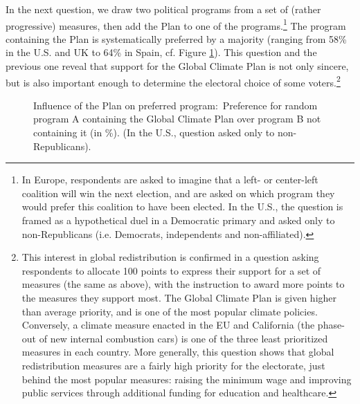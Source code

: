 \documentclass[a5paper,english,openany]{memoir}
\begin{document}
In the next question, we draw two political programs from a set of (rather progressive) measures, then add the Plan to one of the programs.\footnote{In Europe, respondents are asked to imagine that a left- or center-left coalition will win the next election, and are asked on which program they would prefer this coalition to have been elected. In the U.S., the question is framed as a hypothetical duel in a Democratic primary and asked only to non-Republicans (i.e. Democrats, independents and non-affiliated).} The program containing the Plan is systematically preferred by a majority (ranging from 58\% in the U.S. and UK to 64\% in Spain, cf. Figure \ref{fig:conjoint_left_ag_b}). This question and the previous one reveal that support for the Global Climate Plan is not only sincere, but is also important enough to determine the electoral choice of some voters.\footnote{This interest in 
global redistribution is confirmed in a question asking respondents to allocate 100 points to express their support for a set of measures (the same as above), with the instruction to award more points to the measures they support most. The Global Climate Plan is given higher than average priority, and is one of the most popular climate policies. Conversely, a climate measure enacted in the EU and California (the phase-out of new internal combustion cars) is one of the three least prioritized measures in each country. More generally, this question shows that global redistribution measures are a fairly high priority for the electorate, just behind the most popular measures: raising the minimum wage and improving public services through additional funding for education and healthcare.} 

\begin{figure}[h!] 
  \caption[Influence of Plan on preferred program]{Influence of the Plan on preferred program:\ Preference for random program A containing the Global Climate Plan over program B not containing it (in \%). (In the U.S., question asked only to non-Republicans).}\label{fig:conjoint_left_ag_b}
\end{figure}
\end{document}
